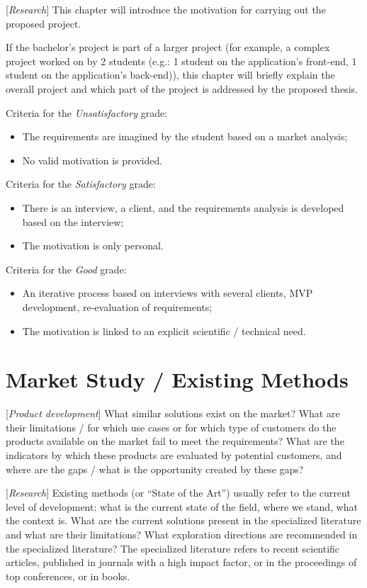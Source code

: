 \documentclass[12pt,a4paper]{report}
\newcommand{\worktype}[1]{[\textit{#1}] }
\newcommand{\dezvoltare}{\worktype{Product development}}
\newcommand{\cercetare}{\worktype{Research}}
\begin{document}
\cercetare This chapter will introduce the motivation for carrying out the proposed project.

If the bachelor's project is part of a larger project (for example, a complex project worked on by 2 students (e.g.: 1 student on the application's front-end, 1 student on the application's back-end)), this chapter will briefly explain the overall project and which part of the project is addressed by the proposed thesis.

Criteria for the \textit{Un\textit{satisfactory}} grade:
\begin{itemize}
	\item \dezvoltare The requirements are imagined by the student based on a market analysis;
	\item \cercetare No valid motivation is provided.
\end{itemize}

Criteria for the \textit{Satisfactory} grade:
\begin{itemize}
	\item \dezvoltare There is an interview, a client, and the requirements analysis is developed based on the interview;
	\item \cercetare The motivation is only personal.
\end{itemize}


Criteria for the \textit{Good} grade:
\begin{itemize}
	\item	 \dezvoltare An iterative process based on interviews with several clients, MVP development, re-evaluation of requirements;
	\item	 \cercetare The motivation is linked to an explicit scientific / technical need.
\end{itemize}


\chapter{Market Study / Existing Methods}
\dezvoltare What similar solutions exist on the market? What are their limitations / for which use cases or for which type of customers do the products available on the market fail to meet the requirements? What are the indicators by which these products are evaluated by potential customers, and where are the gaps / what is the opportunity created by these gaps?

\cercetare Existing methods (or ``State of the Art'') usually refer to the current level of development: what is the current state of the field, where we stand, what the context is. What are the current solutions present in the specialized literature and what are their limitations? What exploration directions are recommended in the specialized literature? The specialized literature refers to recent scientific articles, published in journals with a high impact factor, or in the proceedings of top conferences, or in books.
\end{document}
